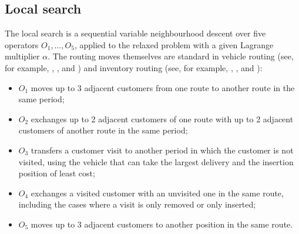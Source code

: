 \documentclass{article}
\begin{document}










\subsection{Local search} \label{sec:local search}


The local search is a sequential variable neighbourhood descent over five operators $O_1,\dots,O_5$, applied to the relaxed problem with a given Lagrange multiplier $\alpha$. The routing moves themselves are standard in vehicle routing (see, for example, \cite{kindervater1997}, \cite{laporte2000classical}, and \cite{elshaer2020taxonomic}) and inventory routing (see, for example, \cite{alvarez2018iterated}, \cite{lagana2024iterated}, and \cite{castro2026hybrid}):

\begin{itemize}
\item $O_1$ moves up to 3 adjacent customers from one route to another route in the same period;
\item $O_2$ exchanges up to 2 adjacent customers of one route with up to 2 adjacent customers of another route in the same period;
\item $O_3$ transfers a customer visit to another period in which the customer is not visited, using the vehicle that can take the largest delivery and the insertion position of least cost;
\item $O_4$ exchanges a visited customer with an unvisited one in the same route, including the cases where a visit is only removed or only inserted;
\item $O_5$ moves up to 3 adjacent customers to another position in the same route.
\end{itemize}
%
\end{document}
